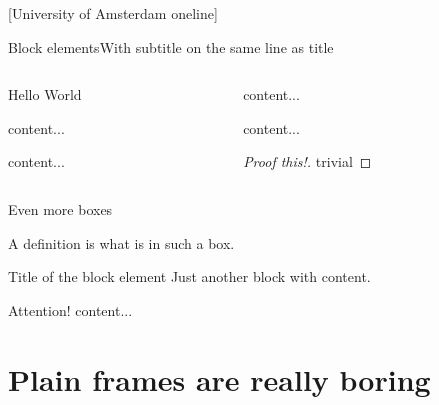 \documentclass[pdf]{beamer}
\begin{document}
{ %
	[University of Amsterdam oneline]

	\begin{frame}{Block elements}{With subtitle on the same line as title}
		\begin{columns}[t]
			\begin{column}{0.45\textwidth}
				\begin{example}
					Hello World
				\end{example}
				\begin{theorem}
					content...
				\end{theorem}
				\begin{corollary}
					content...
				\end{corollary}
			\end{column}
			\begin{column}{0.45\textwidth}
				\begin{fact}
					content...
				\end{fact}
				\begin{lemma}
					content...
				\end{lemma}
				\begin{proof}[Proof \alert{this!}]
					trivial
				\end{proof}
			\end{column}
		\end{columns}
	\end{frame}
}

\begin{frame}{Even more boxes}

	\begin{definition}[of a definition]
		A \alert{definition} is what is in such a box.
	\end{definition}
	\begin{block}{Title of the block element}
		Just another block with content.
	\end{block}
	\begin{alertblock}{Attention!}
		content...
	\end{alertblock}
	
\end{frame}

\section{Plain frames are really boring}
\end{document}
